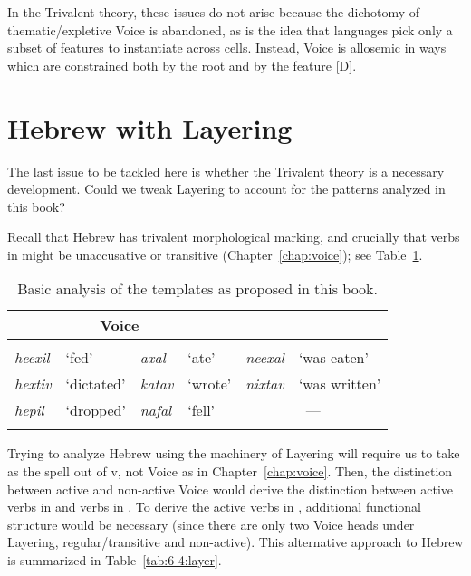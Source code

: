 \begin{exe}
\begin{xlist}
\begin{exe}
\begin{exe}
\begin{xlist}
\begin{exe}
\begin{exe}
\begin{exe}
\begin{exe}
\begin{exe}
\begin{xlist}
\begin{exe}
In the Trivalent theory, these issues do not arise because the dichotomy of thematic/expletive Voice is abandoned, as is the idea that languages pick only a subset of features to instantiate across cells. Instead, Voice is allosemic in ways which are constrained both by the root and by the feature [D].


\section{Hebrew with Layering} \label{aas:hebrew}
The last issue to be tackled here is whether the Trivalent theory is a necessary development. Could we tweak Layering to account for the patterns analyzed in this book?

Recall that Hebrew has trivalent morphological marking, and crucially that verbs in {\tkal} might be unaccusative or transitive (Chapter~\ref{chap:voice}); see Table~\ref{table:aas:alternations-heb2}.
\begin{table}
	\begin{tabularx}{.75\textwidth}{llllll}
 \lsptoprule
	 \multicolumn{2}{c}{\textbf{\vd}}	&	\multicolumn{2}{c}{\textbf{Voice}}	& \multicolumn{2}{c}{\textbf{\vz}}\\\midrule
	\multicolumn{2}{c}{\thif}	&	\multicolumn{2}{c}{\tkal}	& \multicolumn{2}{c}{\tnif}\\
	\emph{heexil}	& `fed' &	\emph{axal}	& `ate'	&	\emph{neexal}	& `was eaten' \\
	\emph{hextiv}	& `dictated' &	\emph{katav}	& `wrote'	&	\emph{nixtav}	& `was written' \\ 
	\emph{hepil} & `dropped' & \emph{nafal}	& `fell' & \multicolumn{2}{c}{---}\\
\lspbottomrule
 	\end{tabularx}
		\caption{Basic analysis of the templates as proposed in this book.}
	\label{table:aas:alternations-heb2} 
\end{table}

Trying to analyze Hebrew using the machinery of Layering will require us to take {\tkal} as the spell out of v, not Voice as in Chapter~\ref{chap:voice}. Then, the distinction between active and non-active Voice would derive the distinction between active verbs in {\tkal} and verbs in {\tnif}. To derive the active verbs in {\thif}, additional functional structure would be necessary (since there are only two Voice heads under Layering, regular/transitive and non-active). This alternative approach to Hebrew is summarized in Table~\ref{tab:6-4:layer}.


\end{exe}
\end{xlist}
\end{exe}
\end{exe}
\end{exe}
\end{exe}
\end{exe}
\end{xlist}
\end{exe}
\end{exe}
\end{xlist}
\end{exe}

